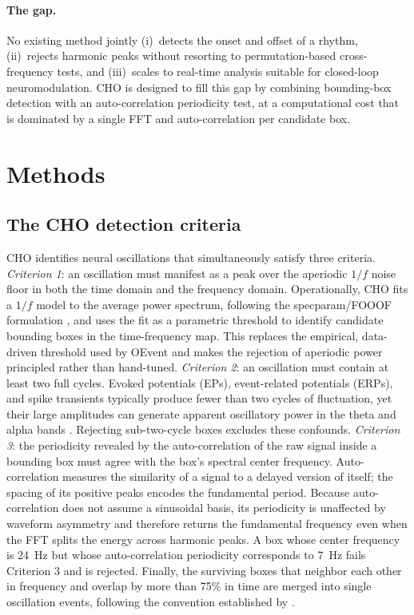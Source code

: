 \documentclass[11pt]{article}
\begin{document}
\paragraph{The gap.} No existing method jointly (i)~detects the onset and offset of a rhythm, (ii)~rejects harmonic peaks without resorting to permutation-based cross-frequency tests, and (iii)~scales to real-time analysis suitable for closed-loop neuromodulation. CHO is designed to fill this gap by combining bounding-box detection with an auto-correlation periodicity test, at a computational cost that is dominated by a single FFT and auto-correlation per candidate box.

\section{Methods}

\subsection{The CHO detection criteria}

CHO identifies neural oscillations that simultaneously satisfy three criteria. \emph{Criterion 1}: an oscillation must manifest as a peak over the aperiodic $1/f$ noise floor in both the time domain and the frequency domain. Operationally, CHO fits a $1/f$ model to the average power spectrum, following the specparam/FOOOF formulation \citep{donoghue2020parameterizing}, and uses the fit as a parametric threshold to identify candidate bounding boxes in the time-frequency map. This replaces the empirical, data-driven threshold used by OEvent \citep{neymotin2022oevent} and makes the rejection of aperiodic power principled rather than hand-tuned. \emph{Criterion 2}: an oscillation must contain at least two full cycles. Evoked potentials (EPs), event-related potentials (ERPs), and spike transients typically produce fewer than two cycles of fluctuation, yet their large amplitudes can generate apparent oscillatory power in the theta and alpha bands \citep{decheveigne2019filters,donoghue2020parameterizing}. Rejecting sub-two-cycle boxes excludes these confounds. \emph{Criterion 3}: the periodicity revealed by the auto-correlation of the raw signal inside a bounding box must agree with the box's spectral center frequency. Auto-correlation measures the similarity of a signal to a delayed version of itself; the spacing of its positive peaks encodes the fundamental period. Because auto-correlation does not assume a sinusoidal basis, its periodicity is unaffected by waveform asymmetry and therefore returns the fundamental frequency even when the FFT splits the energy across harmonic peaks. A box whose center frequency is 24~Hz but whose auto-correlation periodicity corresponds to 7~Hz fails Criterion 3 and is rejected. Finally, the surviving boxes that neighbor each other in frequency and overlap by more than 75\% in time are merged into single oscillation events, following the convention established by \citet{neymotin2022oevent}.
\end{document}
